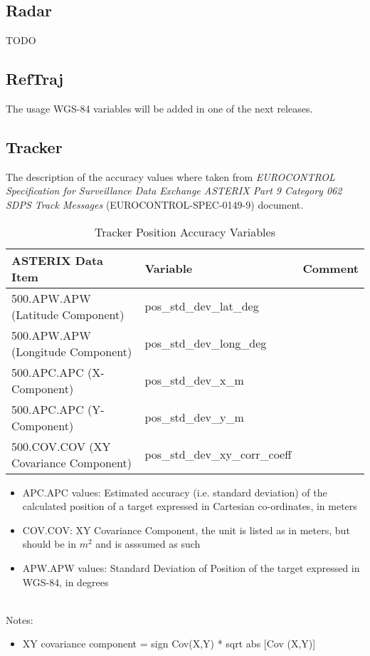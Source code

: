 \subsection{Radar}

TODO

\subsection{RefTraj}

The usage WGS-84 variables will be added in one of the next releases.

\subsection{Tracker}

The description of the accuracy values where taken from \textit{EUROCONTROL Specification for Surveillance Data Exchange ASTERIX Part 9 Category 062 SDPS Track Messages} (EUROCONTROL-SPEC-0149-9) document.

\begin{center}
 \begin{table}[H]
  \begin{tabularx}{\textwidth}{ | X | l | l | }
    \hline
    \textbf{ASTERIX Data Item} & \textbf{Variable} & \textbf{Comment} \\ \hline
     500.APW.APW (Latitude Component) & pos\_std\_dev\_lat\_deg &  \\ \hline
     500.APW.APW (Longitude Component) & pos\_std\_dev\_long\_deg  &  \\ \hline
     500.APC.APC (X-Component) & pos\_std\_dev\_x\_m &  \\ \hline
     500.APC.APC (Y-Component) & pos\_std\_dev\_y\_m  &  \\ \hline
     500.COV.COV (XY Covariance Component) & pos\_std\_dev\_xy\_corr\_coeff  &  \\ \hline
\end{tabularx}
  \caption{Tracker Position Accuracy Variables}
\end{table}
\end{center}

\begin{itemize}
\item APC.APC values: Estimated accuracy (i.e. standard deviation) of the calculated position of a target expressed in Cartesian co-ordinates, in meters
\item COV.COV: XY Covariance Component, the unit is listed as in meters, but should be in $m^2$ and is asssumed as such
\item APW.APW values: Standard Deviation of Position of the target expressed in WGS-84, in degrees
\end{itemize}
\ \\

Notes:
\begin{itemize}
\item XY covariance component = sign {Cov(X,Y)} * sqrt {abs [Cov (X,Y)]}
\end{itemize}

